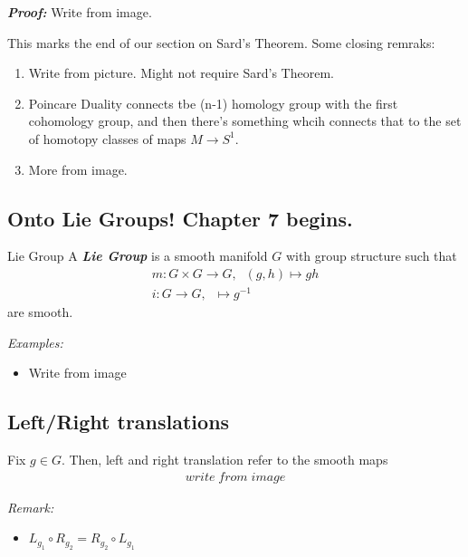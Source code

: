 \documentclass{article}
\begin{document}
\vskip 0.5cm
\emph{\textbf{Proof:}} Write from image.

\vskip 0.5cm
This marks the end of our section on Sard's Theorem. Some closing remraks:
\begin{enumerate}
  \item Write from picture. Might not require Sard's Theorem.
  \item Poincare Duality connects tbe (n-1) homology group with the first cohomology group, and then there's something whcih connects that to the set of homotopy classes of maps $M \rightarrow S^1$.
  \item More from image.
\end{enumerate}

\vskip 1cm
\subsection{Onto Lie Groups! Chapter 7 begins.}

\begin{mathdefinitionbox}{Lie Group}
  \vskip 0.25cm
  A \emph{\textbf{Lie Group}} is a smooth manifold $G$ with group structure such that 
  \begin{align*}
    m : G \times G \rightarrow G, \;\;(g,h) \mapsto gh \\
    i : G \rightarrow G, \;\; \mapsto g^{-1}
  \end{align*}
  are smooth.
\end{mathdefinitionbox}

\vskip 0.5cm
\emph{Examples:}
\begin{itemize}
  \item Write from image
\end{itemize}

\vskip 0.5cm
\subsection*{Left/Right translations}

\begin{mathdefinitionbox}{}
  Fix $g \in G$. Then, left and right translation refer to the smooth maps
  \begin{align*}
    write \; from \; image
  \end{align*}
\end{mathdefinitionbox}

\begin{dottedbox}
  \emph{Remark:} 
  \begin{itemize}
    \item $L_{g_1} \circ R_{g_2} = R_{g_2} \circ L_{g_1}$
  \end{itemize}
\end{dottedbox}
\end{document}

